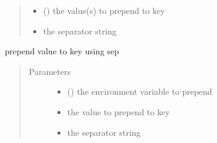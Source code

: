 \documentclass[a4paper,10pt,english]{sphinxmanual}
\begin{document}
\begin{fulllineitems}
\begin{fulllineitems}
\begin{quote}
\begin{description}
\begin{itemize}
\item {} 
 () \textendash{} the value(s) to prepend to key

\item {} 
 \textendash{} the separator string

\end{itemize}

\end{description}\end{quote}

\end{fulllineitems}


\begin{fulllineitems}
\label{\detokenize{commands/apidoc/src:src.fileEnviron.LauncherFileEnviron.prepend_value}}
prepend value to key using sep
\begin{quote}\begin{description}
\item[{Parameters}] \leavevmode\begin{itemize}
\item {} 
 () \textendash{} the environment variable to prepend

\item {} 
 \textendash{} the value to prepend to key

\item {} 
 \textendash{} the separator string

\end{itemize}

\end{description}\end{quote}

\end{fulllineitems}



\end{fulllineitems}
\end{document}
